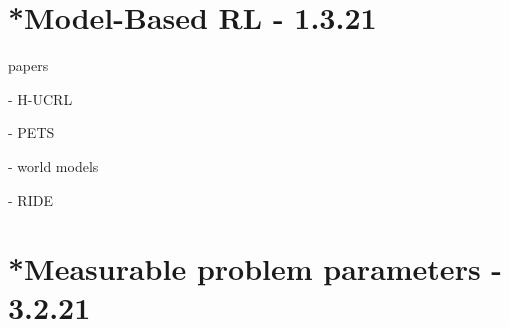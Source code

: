\documentclass[letterpaper]{article}
\theoremstyle{definition}
\begin{document}
%
%
%


\section{*Model-Based RL - 1.3.21} \label{sec:mbrl}

papers

\cite{Curi2020} - H-UCRL

\cite{Chua2018} - PETS

\cite{Ha2018} - world models

\cite{Raileanu2020} - RIDE

\section{*Measurable problem parameters - 3.2.21} \label{sec:experiments}
\end{document}
